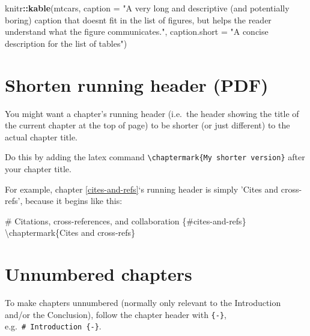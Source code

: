\documentclass[a4paper, twoside]{templates/ociamthesis}
\newenvironment{Shaded}{\begin{snugshade}}{\end{snugshade}}
\newcommand{\DataTypeTok}[1]{\textcolor[rgb]{0.13,0.29,0.53}{#1}}
\newcommand{\FunctionTok}[1]{\textcolor[rgb]{0.00,0.00,0.00}{#1}}
\newcommand{\KeywordTok}[1]{\textcolor[rgb]{0.13,0.29,0.53}{\textbf{#1}}}
\newcommand{\NormalTok}[1]{#1}
\newcommand{\OperatorTok}[1]{\textcolor[rgb]{0.81,0.36,0.00}{\textbf{#1}}}
\newcommand{\StringTok}[1]{\textcolor[rgb]{0.31,0.60,0.02}{#1}}
\renewenvironment{Shaded}
{
  \vspace{10pt}%
  \begin{snugshade}%
}{%
  \end{snugshade}%
  \vspace{8pt}%
}
\theoremstyle{definition}
\theoremstyle{definition}
\theoremstyle{definition}
\theoremstyle{definition}
\theoremstyle{remark}
\begin{document}
\begin{Shaded}
\begin{Highlighting}[]
\NormalTok{knitr}\OperatorTok{::}\KeywordTok{kable}\NormalTok{(mtcars,}
              \DataTypeTok{caption =} \StringTok{"A very long and descriptive (and potentially}
\StringTok{              boring) caption that doesn\textquotesingle{}t fit in the list of figures,}
\StringTok{              but helps the reader understand what the figure }
\StringTok{              communicates."}\NormalTok{,}
              \DataTypeTok{caption.short =} \StringTok{"A concise description for the list of tables"}\NormalTok{)}
\end{Highlighting}
\end{Shaded}

\hypertarget{shorten-running-header-pdf}{%
\section{Shorten running header (PDF)}\label{shorten-running-header-pdf}}

You might want a chapter's running header (i.e.~the header showing the title of the current chapter at the top of page) to be shorter (or just different) to the actual chapter title.

Do this by adding the latex command \texttt{\textbackslash{}chaptermark\{My\ shorter\ version\}} after your chapter title.

For example, chapter \ref{cites-and-refs}`s running header is simply 'Cites and cross-refs', because it begins like this:

\begin{Shaded}
\begin{Highlighting}[]
\FunctionTok{\# Citations, cross{-}references, and collaboration \{\#cites{-}and{-}refs\} }
\NormalTok{\textbackslash{}chaptermark\{Cites and cross{-}refs\}}
\end{Highlighting}
\end{Shaded}

\hypertarget{unnumbered-chapters}{%
\section{Unnumbered chapters}\label{unnumbered-chapters}}

To make chapters unnumbered (normally only relevant to the Introduction and/or the Conclusion), follow the chapter header with \texttt{\{-\}}, e.g.~\texttt{\#\ Introduction\ \{-\}}.
\end{document}
